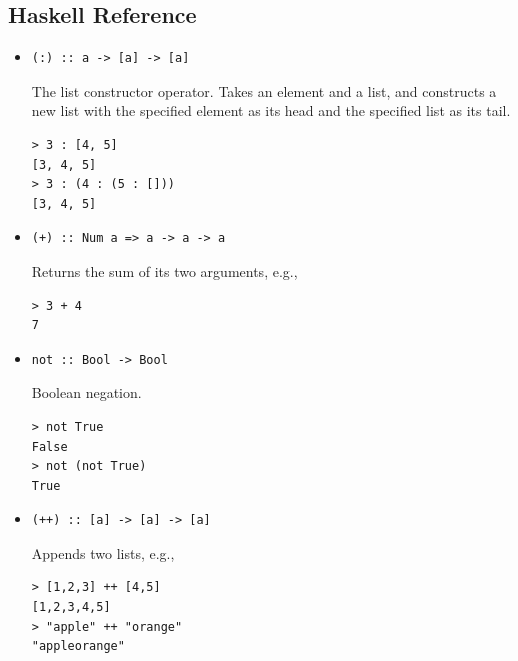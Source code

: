 \documentclass[addpoints,answers]{exam}
\begin{document}
\newpage

\subsection*{Haskell Reference}

\begin{itemize}

\item
\begin{verbatim}
(:) :: a -> [a] -> [a]
\end{verbatim}
The list constructor operator.  Takes an element and a list, and constructs a new list with the specified element as its head and the specified list as its tail.
\begin{verbatim}
> 3 : [4, 5]
[3, 4, 5]
> 3 : (4 : (5 : []))
[3, 4, 5]
\end{verbatim}

\item
\begin{verbatim}
(+) :: Num a => a -> a -> a
\end{verbatim}
Returns the sum of its two arguments, e.g.,
\begin{verbatim}
> 3 + 4
7
\end{verbatim}

\item
\begin{verbatim}
not :: Bool -> Bool
\end{verbatim}
Boolean negation.
\begin{verbatim}
> not True
False
> not (not True)
True
\end{verbatim}

\item
\begin{verbatim}
(++) :: [a] -> [a] -> [a]
\end{verbatim}
Appends two lists, e.g.,
\begin{verbatim}
> [1,2,3] ++ [4,5]
[1,2,3,4,5]
> "apple" ++ "orange"
"appleorange"
\end{verbatim}

\end{itemize}
\end{document}
